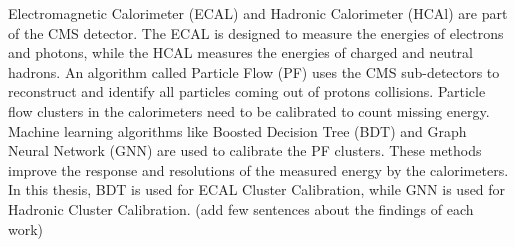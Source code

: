 

Electromagnetic Calorimeter (ECAL) and Hadronic Calorimeter (HCAl) are part of the CMS detector.
The ECAL is designed to measure the energies of electrons and photons, while the HCAL measures the energies of charged and neutral hadrons.
An algorithm called Particle Flow (PF) uses the CMS sub-detectors to reconstruct and identify all particles coming out of protons collisions.
Particle flow clusters in the calorimeters need to be calibrated to count missing energy.
Machine learning algorithms like Boosted Decision Tree (BDT) and Graph Neural Network (GNN) are used to calibrate the PF clusters.
These methods improve the response and resolutions of the measured energy by the calorimeters.
In this thesis, BDT is used for ECAL Cluster Calibration, while GNN is used for Hadronic Cluster Calibration. 
(add few sentences about the findings of each work) 



